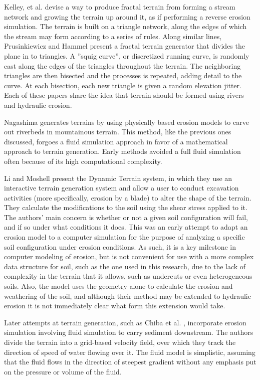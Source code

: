 Kelley, et al. \cite{Kelley-TerrainSimulation} devise a way to produce fractal terrain from forming a stream network and growing the terrain up around it, as if performing a reverse erosion simulation. The terrain is built on a triangle network, along the edges of which the stream may form according to a series of rules. Along similar lines, Prusinkiewicz and Hammel \cite{Hammel-FractalMountainsRivers} present a fractal terrain generator that divides the plane in to triangles. A ''squig curve'', or discretized running curve, is randomly cast along the edges of the triangles throughout the terrain. The neighboring triangles are then bisected and the processes is repeated, adding detail to the curve. At each bisection, each new triangle is given a random elevation jitter. Each of these papers share the idea that terrain should be formed using rivers and hydraulic erosion.

Nagashima \cite{Nagashima-ErodedValleyGeneration} generates terrains by using physically based erosion models to carve out riverbeds in mountainous terrain. This method, like the previous ones discussed, forgoes a fluid simulation approach in favor of a mathematical approach to terrain generation. Early methods avoided a full fluid simulation often because of its high computational complexity.

Li and Moshell \cite{Li-ModelingSoilDynamics} present the Dynamic Terrain system, in which they use an interactive terrain generation system and allow a user to conduct excavation activities (more specifically, erosion by a blade) to alter the shape of the terrain. They calculate the modifications to the soil using the shear stress applied to it. The authors' main concern is whether or not a given soil configuration will fail, and if so under what conditions it does. This was an early attempt to adapt an erosion model to a computer simulation for the purpose of analyzing a specific soil configuration under erosion conditions. As such, it is a key milestone in computer modeling of erosion, but is not convenient for use with a more complex data structure for soil, such as the one used in this research, due to the lack of complexity in the terrain that it allows, such as undercuts or even heterogeneous soils. Also, the model uses the geometry alone to calculate the erosion and weathering of the soil, and although their method may be extended to hydraulic erosion it is not immediately clear what form this extension would take.

Later attempts at terrain generation, such as Chiba et al. \cite{Chiba-VelocityFields}, incorporate erosion simulation involving fluid simulation to carry sediment downstream. The authors divide the terrain into a grid-based velocity field, over which they track the direction of speed of water flowing over it. The fluid model is simplistic, assuming that the fluid flows in the direction of steepest gradient without any emphasis put on the pressure or volume of the fluid.

